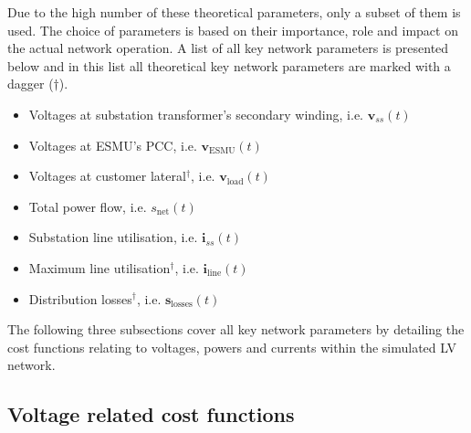 Due to the high number of these theoretical parameters, only a subset of them is used.
The choice of parameters is based on their importance, role and impact on the actual network operation.
A list of all key network parameters is presented below and in this list all theoretical key network parameters are marked with a dagger ($\dagger$).

\begin{itemize}
	\item Voltages at substation transformer's secondary winding, i.e. $\textbf{v}_{ss}(t)$
	\item Voltages at ESMU's PCC, i.e. $\textbf{v}_\text{ESMU}(t)$
	\item Voltages at customer lateral$^{\dagger}$, i.e. $\textbf{v}_\text{load}(t)$
	\item Total power flow, i.e. $s_\text{net}(t)$
	\item Substation line utilisation, i.e. $\textbf{i}_{ss}(t)$
	\item Maximum line utilisation$^{\dagger}$, i.e. $\textbf{i}_\text{line}(t)$
	\item Distribution losses$^{\dagger}$, i.e. $\textbf{s}_\text{losses}(t)$
\end{itemize}


The following three subsections cover all key network parameters by detailing the cost functions relating to voltages, powers and currents within the simulated LV network.

\subsection{Voltage related cost functions}
\label{ch1:subsec:voltages-related-cost-functions}


